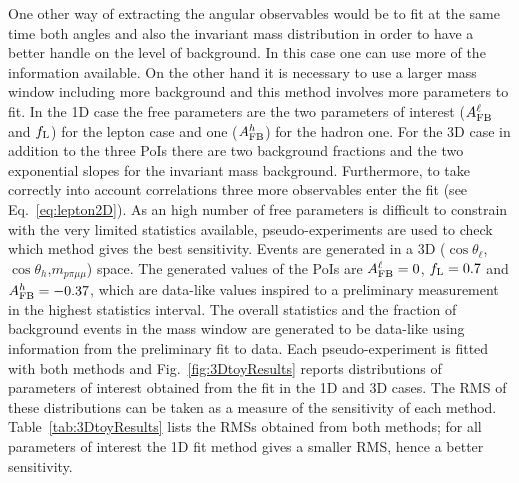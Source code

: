 One other way of extracting the angular observables would be to fit at the same time both angles 
and also the invariant mass distribution in order to have a better handle on the level of background.
In this case one can use more of the information available. On the other hand it is necessary to use 
a larger mass window including more background and this method involves more parameters to fit.
In the 1D case the free parameters are the two parameters of interest ($A_{\rm FB}^\ell$ and $f_{\rm L}$)
for the lepton case and one ($A_{\rm FB}^h$) for the hadron one. 
For the 3D case in addition to the three PoIs there are 
two background fractions and the two exponential slopes for the invariant mass background.
%
Furthermore, to take correctly into account correlations three more observables enter the fit (see Eq.~\ref{eq:lepton2D}). 
As an high number of free parameters is difficult to constrain with the very limited statistics available, 
%
pseudo-experiments are used to check which method gives the best sensitivity.
Events are generated in a 3D ($\cos\theta_\ell$,$\cos\theta_h$,$m_{p\pi\mu\mu}$) space.
The generated values of the PoIs are $A_{\rm FB}^\ell = 0$, $f_{\rm L} = 0.7$ 
and $A_{\rm FB}^h = -0.37$, which are data-like values inspired to a preliminary measurement
in the highest statistics interval. The overall statistics and the fraction of background events
in the mass window are generated to be data-like using information from the preliminary fit to data.
%
Each pseudo-experiment is fitted with both methods and Fig.~\ref{fig:3DtoyResults} reports 
distributions of parameters of interest obtained from the fit in the 1D and 3D cases.
The RMS of these distributions can be taken as a measure of the sensitivity of each method.
Table~\ref{tab:3DtoyResults} lists the RMSs obtained from both methods; for all parameters 
of interest the 1D fit method gives a smaller RMS, hence a better sensitivity.
%
